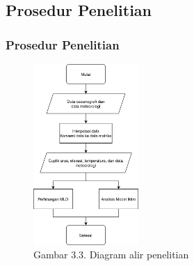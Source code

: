 \documentclass{beamer}
\begin{document}
\subsection{Prosedur Penelitian}
\begin{frame}
	\frametitle{Prosedur Penelitian}
	\begin{figure}[H]
		\centering
		\includegraphics[width=4cm]{flowchart.png}
		\captionsetup{labelformat=empty}
		\caption{Gambar 3.3. Diagram alir penelitian}
		\label{fig:flowchart}
	\end{figure}
\end{frame}
\end{document}
